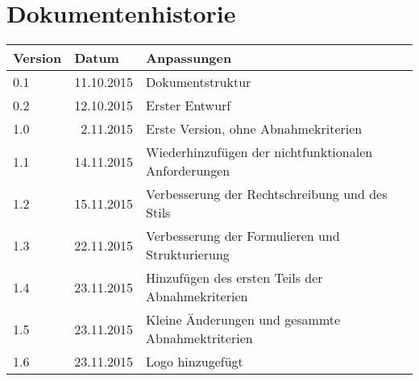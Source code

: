 \section*{Dokumentenhistorie}
\begin{tabularx}{\linewidth}{|l|r|X|} \hline
Version & \multicolumn{1}{l|}{Datum} 			& Anpassungen \\ \hline
0.1 & 11.10.2015 & Dokumentstruktur \\ \hline
0.2	& 12.10.2015 & Erster Entwurf  \\ \hline
1.0 &  2.11.2015 & Erste Version, ohne Abnahmekriterien \\ \hline
1.1 & 14.11.2015 & Wiederhinzufügen der nichtfunktionalen Anforderungen \\ \hline
1.2 & 15.11.2015 & Verbesserung der Rechtschreibung und des Stils \\ \hline
1.3 & 22.11.2015 & Verbesserung der Formulieren und Strukturierung\\ \hline
1.4 & 23.11.2015 & Hinzufügen des ersten Teils der Abnahmekriterien\\ \hline
1.5 & 23.11.2015 & Kleine Änderungen und gesammte Abnahmektriterien\\ \hline
1.6 & 23.11.2015 & Logo hinzugefügt\\ \hline
\end{tabularx}

